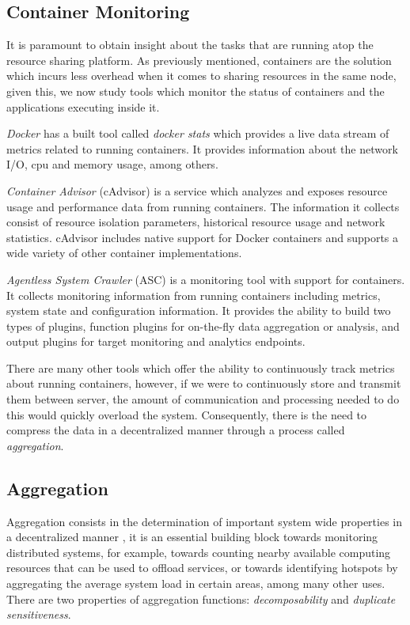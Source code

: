\subsection{Container Monitoring}

It is paramount to obtain insight about the tasks that are running atop the resource sharing platform. As previously mentioned, containers are the solution which incurs less overhead when it comes to sharing resources in the same node, given this, we now study tools which monitor the status of containers and the applications executing inside it. 

\textit{Docker} \cite{docker} has a built tool called \textit{docker stats} \cite{docker_stats} which provides a live data stream of metrics related to running containers. It provides information about the network I/O, cpu and memory usage, among others. 

\textit{Container Advisor} \cite{cAdvisor} (cAdvisor) is a service which analyzes and exposes resource usage and performance data from running containers.  The information it collects consist of resource isolation parameters, historical resource usage and network statistics. cAdvisor includes native support for Docker containers and supports a wide variety of other container implementations.

\textit{Agentless System Crawler}  (ASC) \cite{cloudviz_2019} is a monitoring tool with support for containers. It collects monitoring information from running containers including metrics, system state and configuration information. It provides the ability to build two types of plugins, function  plugins for on-the-fly data aggregation or analysis, and output plugins for target monitoring and analytics endpoints.

There are many other tools which offer the ability to continuously track metrics about running containers, however, if we were to continuously store and transmit them between server, the amount of communication and processing needed to do this would quickly overload the system. Consequently, there is the need  to compress the data in a decentralized manner through a process called \textit{aggregation}.

\subsection{Aggregation}

Aggregation consists in the determination of important system wide properties in a decentralized manner \cite{DBLP:journals/corr/abs-1110-0725}, it is an essential building block towards monitoring distributed systems, for example, towards counting nearby available computing resources that can be used to offload services, or towards identifying hotspots by aggregating the average system load in certain areas, among many other uses. There are two properties of aggregation functions: \textit{decomposability} and \textit{duplicate sensitiveness}.

